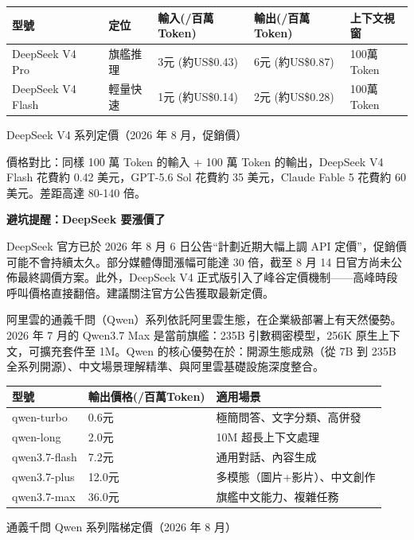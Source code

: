 \begin{center}
\begin{tabularx}{\linewidth}{|X|X|X|X|X|}
\hline
\textbf{型號} & \textbf{定位} & \textbf{輸入(/百萬Token)} & \textbf{輸出(/百萬Token)} & \textbf{上下文視窗} \tabularnewline
\hline
DeepSeek V4 Pro & 旗艦推理 & 3元 (約US\$0.43) & 6元 (約US\$0.87) & 100萬Token \tabularnewline
DeepSeek V4 Flash & 輕量快速 & 1元 (約US\$0.14) & 2元 (約US\$0.28) & 100萬Token \tabularnewline
\hline
\end{tabularx}
\end{center}

\begin{center}\small\color{gray}DeepSeek V4 系列定價（2026 年 8 月，促銷價）\end{center}

價格對比：同樣 100 萬 Token 的輸入 + 100 萬 Token 的輸出，DeepSeek V4 Flash 花費約 0.42 美元，GPT-5.6 Sol 花費約 35 美元，Claude Fable 5 花費約 60 美元。差距高達 80-140 倍。

\textbf{避坑提醒：DeepSeek 要漲價了}\par

DeepSeek 官方已於 2026 年 8 月 6 日公告“計劃近期大幅上調 API 定價”，促銷價可能不會持續太久。部分媒體傳聞漲幅可能達 30 倍，截至 8 月 14 日官方尚未公佈最終調價方案。此外，DeepSeek V4 正式版引入了峰谷定價機制——高峰時段呼叫價格直接翻倍。建議關注官方公告獲取最新定價。


阿里雲的通義千問（Qwen）系列依託阿里雲生態，在企業級部署上有天然優勢。2026 年 7 月的 Qwen3.7 Max 是當前旗艦：235B 引數稠密模型，256K 原生上下文，可擴充套件至 1M。Qwen 的核心優勢在於：開源生態成熟（從 7B 到 235B 全系列開源）、中文場景理解精準、與阿里雲基礎設施深度整合。

\begin{center}
\begin{tabularx}{\linewidth}{|X|X|X|}
\hline
\textbf{型號} & \textbf{輸出價格(/百萬Token)} & \textbf{適用場景} \tabularnewline
\hline
qwen-turbo & 0.6元 & 極簡問答、文字分類、高併發 \tabularnewline
qwen-long & 2.0元 & 10M 超長上下文處理 \tabularnewline
qwen3.7-flash & 7.2元 & 通用對話、內容生成 \tabularnewline
qwen3.7-plus & 12.0元 & 多模態（圖片+影片）、中文創作 \tabularnewline
qwen3.7-max & 36.0元 & 旗艦中文能力、複雜任務 \tabularnewline
\hline
\end{tabularx}
\end{center}

\begin{center}\small\color{gray}通義千問 Qwen 系列階梯定價（2026 年 8 月）\end{center}

